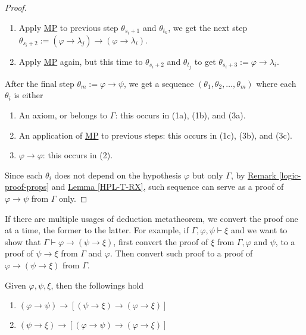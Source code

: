 \documentclass{treatise}
\begin{document}
\begin{proof}
\begin{enumerate}
\begin{enumerate}
        \item Apply \hyperref[HPL-R-MP]{MP} to previous step $\theta_{s_i + 1}$ and $\theta_{t_k}$, we get the next step $\theta_{s_i + 2} := (\varphi \to \lambda_j) \to (\varphi \to \lambda_i)$.
        \item Apply \hyperref[HPL-R-MP]{MP} again, but this time to $\theta_{s_i + 2}$ and $\theta_{t_j}$ to get $\theta_{s_i + 3} := \varphi \to \lambda_i$.
    \end{enumerate}
\end{enumerate}
After the final step $\theta_m := \varphi \to \psi$, we get a sequence $(\theta_1, \theta_2, \hdots, \theta_m)$ where each $\theta_i$ is either
\begin{enumerate}
    \item An axiom, or belongs to $\Gamma$: this occurs in (1a), (1b), and (3a).
    \item An application of \hyperref[HPL-R-MP]{MP} to previous steps: this occurs in (1c), (3b), and (3c).
    \item $\varphi \to \varphi$: this occurs in (2).
\end{enumerate}
Since each $\theta_i$ does not depend on the hypothesis $\varphi$ but only $\Gamma$, by \hyperref[logic-proof-props]{Remark \ref*{logic-proof-props}} and \hyperref[HPL-T-RX]{Lemma \ref*{HPL-T-RX}}, such sequence can serve as a proof of $\varphi \to \psi$ from $\Gamma$ only.
\end{proof}
\begin{remark}
If there are multiple usages of deduction metatheorem, we convert the proof one at a time, the former to the latter. For example, if $\Gamma, \varphi, \psi \vdash \xi$ and we want to show that $\Gamma \vdash \varphi \to (\psi \to \xi)$, first convert the proof of $\xi$ from $\Gamma, \varphi$ and $\psi$, to a proof of $\psi \to \xi$ from $\Gamma$ and $\varphi$. Then convert such proof to a proof of $\varphi \to (\psi \to \xi)$ from $\Gamma$.
\end{remark}
\begin{proposition} \label{HPL-T-HS}
Given $\varphi, \psi, \xi$, then the followings hold
\begin{enumerate}
    \item $(\varphi \to \psi) \to [(\psi \to \xi) \to (\varphi \to \xi)]$
    \item $(\psi \to \xi) \to [(\varphi \to \psi) \to (\varphi \to \xi)]$
\end{enumerate}
\end{proposition}
\end{document}
